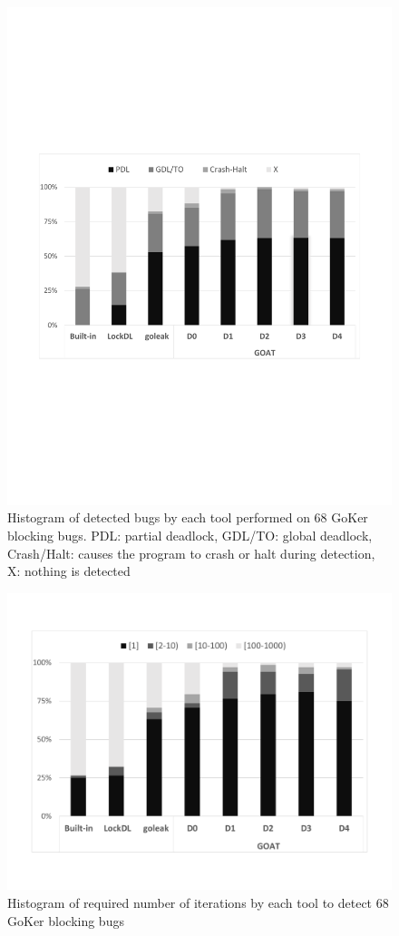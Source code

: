 \begin{figure}
\centering
  \includegraphics[width=.95\linewidth]{figs/P4_detections.pdf}
  \caption{Histogram of detected bugs by each tool performed on 68 GoKer blocking bugs. PDL: partial deadlock, GDL/TO: global deadlock, Crash/Halt: causes the program to crash or halt during detection, X: nothing is detected }
  \label{fig:detection}
\end{figure}


\begin{figure}
\centering
  \includegraphics[width=.95\linewidth]{figs/P4_runs.pdf}
  \caption{Histogram of required number of iterations by each tool to detect 68 GoKer blocking bugs}
  \label{fig:runs}
\end{figure}

